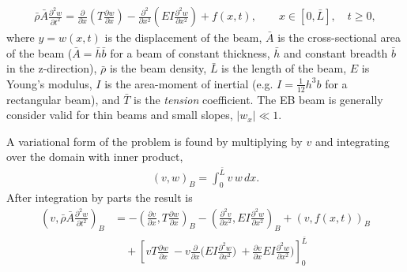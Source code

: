 \documentclass[11pt]{article}
\begin{document}
\newcommand{\rhos}{\bar{\rho}}
\newcommand{\hs}{\bar{h}}
\newcommand{\bs}{\bar{b}}
\newcommand{\As}{\bar{A}}
\newcommand{\Ts}{\bar{T}}
\newcommand{\Ls}{\bar{L}}
\begin{align}
  \rhos \As \frac{\partial^2 w}{\partial t^2} = 
                   \frac{\partial}{\partial x}\left( T \frac{\partial w}{\partial x}\right)
                   - \frac{\partial^2}{\partial x^2}\left( E I \frac{\partial^2 w}{\partial x^2}\right)
                   + f(x,t), \qquad x\in[0,\Ls], \quad t\ge 0,
\end{align}
where $y=w(x,t)$ is the displacement of the beam, 
$\As$ is the cross-sectional area of the beam ($\As=\hs\bs$ for a beam of constant thickness, $\hs$ and constant breadth $\bs$ in the z-direction), 
$\rhos$ is the beam density, $\Ls$ is the length of the beam, 
$E$ is Young's modulus, $I$ is the area-moment of inertial (e.g. $I=\frac{1}{12} h^3 b$ for a rectangular beam),
and $\Ts$ is the {\em tension} coefficient. 
% 
The EB beam is generally consider valid for thin beams and small slopes,  $|w_x| \ll 1$.


A variational form of the problem is found by multiplying by $v$ and integrating over the domain with inner product,
\begin{align}
   (v,w)_B = \int_0^{\Ls} v \, w \, dx. 
\end{align}
After integration by parts the result is 
\begin{align}
 \left( v,  \rhos \As \frac{\partial^2 w}{\partial t^2} \right)_B  &= 
                  - \left( \frac{\partial v}{\partial x} , T \frac{\partial w}{\partial x} \right)_B
                  -\left(\frac{\partial^2 v}{\partial x^2}, E I \frac{\partial^2 w}{\partial x^2}\right)_B  + ( v, f(x,t))_B \\
             &\quad  +   \left[ v T \frac{\partial w}{\partial x} ~ -v \frac{\partial}{\partial x}\Big( E I \frac{\partial^2 w}{\partial x^2}\Big) 
                      ~ + \frac{\partial v}{\partial x}E I \frac{\partial^2 w}{\partial x^2}\Big)  
                      \right]_0^{\Ls}   \label{eq:beamBoundaryTerms}
\end{align}
\end{document}
